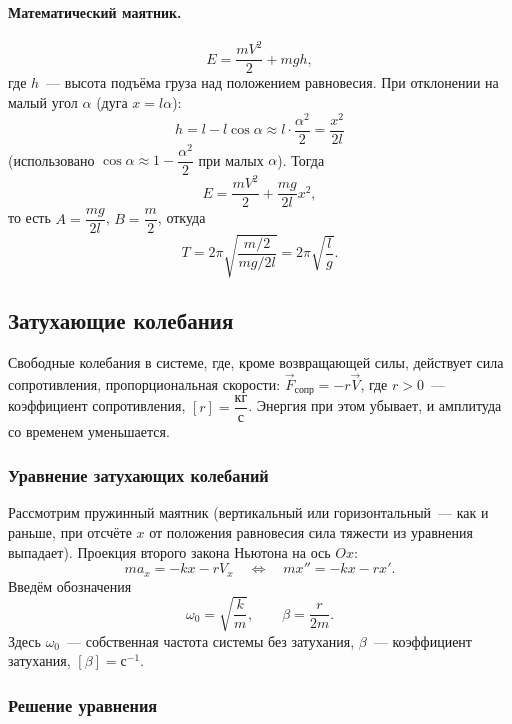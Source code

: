 \documentclass[12pt]{article}
\begin{document}
	\paragraph{Математический маятник.}
	\[
		E = \frac{mV^2}{2} + mgh,
	\]
	где $h$~--- высота подъёма груза над положением равновесия. При отклонении на малый угол $\alpha$ (дуга $x = l\alpha$):
	\[
		h = l - l\cos\alpha \approx l\cdot\frac{\alpha^2}{2} = \frac{x^2}{2l}
	\]
	(использовано $\cos\alpha \approx 1 - \dfrac{\alpha^2}{2}$ при малых $\alpha$). Тогда
	\[
		E = \frac{mV^2}{2} + \frac{mg}{2l}x^2,
	\]
	то есть $A = \dfrac{mg}{2l}$, $B = \dfrac{m}{2}$, откуда
	\[
		T = 2\pi\sqrt{\frac{m/2}{mg/2l}} = 2\pi\sqrt{\frac{l}{g}}.
	\]

	\subsection{Затухающие колебания}
	
	\begin{definition}
		Свободные колебания в системе, где, кроме возвращающей силы, действует сила сопротивления, пропорциональная скорости: $\vec{F}_{\text{сопр}} = -r\vec{V}$, где $r > 0$~--- коэффициент сопротивления, $[r] = \dfrac{\text{кг}}{\text{с}}$. Энергия при этом убывает, и амплитуда со временем уменьшается.
	\end{definition}
	
	\subsubsection{Уравнение затухающих колебаний}
	
	Рассмотрим пружинный маятник (вертикальный или горизонтальный~--- как и раньше, при отсчёте $x$ от положения равновесия сила тяжести из уравнения выпадает). Проекция второго закона Ньютона на ось $Ox$:
	\[
		ma_x = -kx - rV_x \quad \Longleftrightarrow \quad mx'' = -kx - rx'.
	\]
	Введём обозначения
	\[
		\omega_0 = \sqrt{\dfrac{k}{m}}, \qquad \beta = \dfrac{r}{2m}.
	\]
	Здесь $\omega_0$~--- собственная частота системы без затухания, $\beta$~--- коэффициент затухания, $[\beta] = \text{с}^{-1}$.
	
	\subsubsection{Решение уравнения}
	
\end{document}
